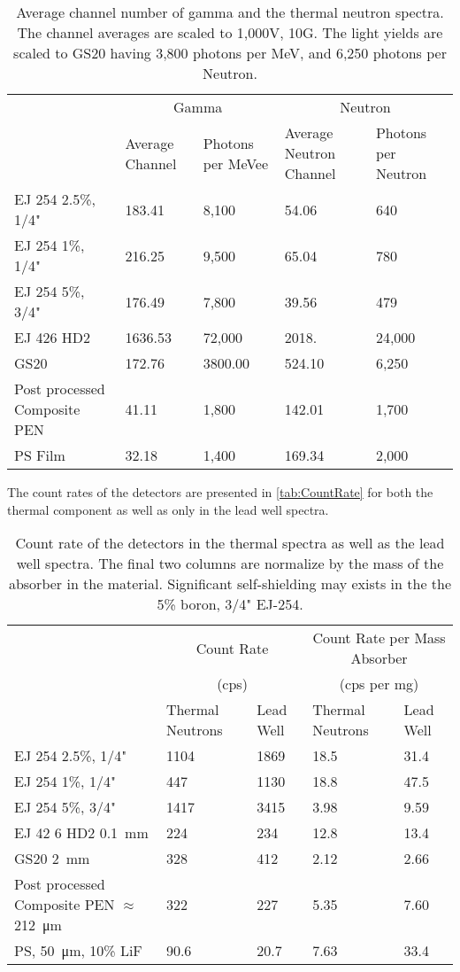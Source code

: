 \begin{table}
  \centering
  \caption[Average Channel Number of Gamma and Neutron Spectra]{Average channel number of gamma and the thermal neutron spectra.  The channel averages are scaled to 1,000V, 10G. The light yields are scaled to GS20 having 3,800 photons per MeV, and 6,250 photons per Neutron.}
  \label{tab:AvgChNG}
  \begin{tabular}{m{3.5cm}| m{2.2cm} m{2cm} |m{2cm} m{4cm}}
    \toprule
        &\multicolumn{2}{|c|}{Gamma}&\multicolumn{2}{|c}{Neutron}\\
        & Average Channel& Photons per MeVee & Average Neutron Channel & Photons per Neutron\\
    \midrule
    EJ 254 2.5\%, 1/4"&	183.41	&	8,100	&	54.06	&	640	\\
    EJ 254 1\%, 1/4"&	216.25	&	9,500	&	65.04	&	780	\\
    EJ 254 5\%, 3/4"&	176.49	&	7,800	&	39.56	&	479	\\
    EJ 426 HD2&	1636.53	&	72,000	&	2018.	& 	24,000	\\
    GS20 &	172.76	&	3800.00	&	524.10	&	6,250	\\
    Post processed Composite PEN & 41.11 & 1,800 & 142.01 & 1,700\\
    PS Film & 32.18 & 1,400 & 169.34 & 2,000 \\
    \bottomrule
  \end{tabular}
\end{table}
The count rates of the detectors are presented in \autoref{tab:CountRate} for both the thermal component as well as only in the lead well spectra.
\begin{table}
\centering
  \caption[Detector Count Rate]{Count rate of the detectors in the thermal spectra as well as the lead well spectra.  The final two columns are normalize by the mass of the absorber in the material. Significant self-shielding may exists in the the 5\% boron, 3/4" EJ-254.}
  \label{tab:CountRate}
  \begin{tabular}{m{4cm}| m{2cm} m{2cm} |m{2cm} m{2.2cm}}
  \toprule
    &\multicolumn{2}{|c|}{Count Rate}&\multicolumn{2}{|c}{Count Rate per Mass Absorber} \\
    &\multicolumn{2}{|c|}{(cps)}&\multicolumn{2}{|c}{(cps per mg)} \\
    & Thermal Neutrons &Lead Well & Thermal Neutrons & Lead Well\\
  \midrule
  EJ 254 2.5\%, 1/4"&	1104	&	1869	&	18.5	&	31.4	\\
  EJ 254 1\%, 1/4"&	447	&	1130	&	18.8	&	47.5	\\
  EJ 254 5\%, 3/4"&	1417	&	3415	&	3.98	&	9.59	\\
  EJ 42 6 HD2 \SI{0.1}{\mm}&	224	&	234	&	12.8	&	13.4	\\
  GS20 \SI{2}{\mm}&	328	&	412	&	2.12	&	2.66	\\
  Post processed Composite PEN $\approx$ \SI{212}{\um}&	322	& 227	&	5.35 &	7.60	\\
  PS, \SI{50}{\um}, 10\% LiF & 90.6 & 20.7 & 7.63& 33.4 \\
  \bottomrule
  \end{tabular}
\end{table}
